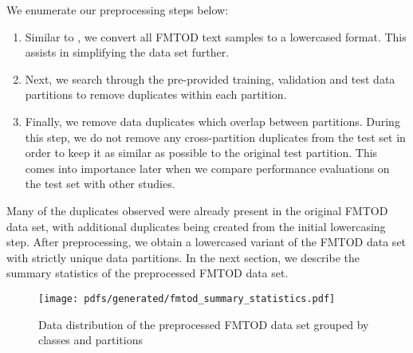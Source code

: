 We enumerate our preprocessing steps below:

\begin{enumerate}{}
  \item Similar to \citet{schwartz2018sopa}, we convert all FMTOD text samples to a lowercased format. This assists in simplifying the data set further.
  \item Next, we search through the pre-provided training, validation and test data partitions to remove duplicates within each partition.
  \item Finally, we remove data duplicates which overlap between partitions. During this step, we do not remove any cross-partition duplicates from the test set in order to keep it as similar as possible to the original test partition. This comes into importance later when we compare performance evaluations on the test set with other studies.
\end{enumerate}

Many of the duplicates observed were already present in the original FMTOD data set, with additional duplicates being created from the initial lowercasing step. After preprocessing, we obtain a lowercased variant of the FMTOD data set with strictly unique data partitions. In the next section, we describe the summary statistics of the preprocessed FMTOD data set.

\begin{figure}[t]
  \centering
  \texttt{[image: pdfs/generated/fmtod\_summary\_statistics.pdf]}
  \caption{Data distribution of the preprocessed FMTOD data set grouped by classes and partitions}
  \label{fig:fmtod}
\end{figure}

